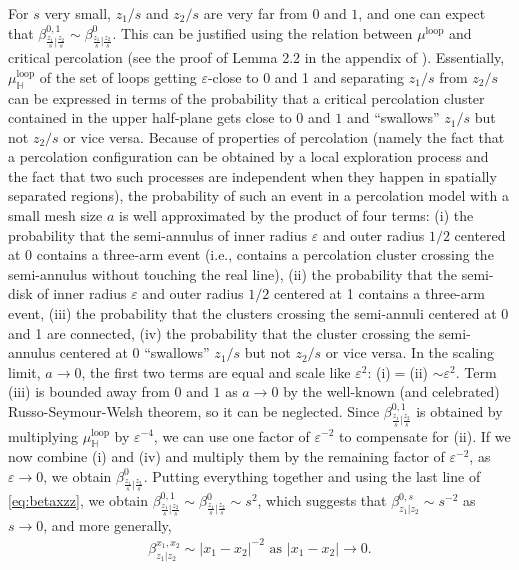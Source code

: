 \documentclass[a4paper,11pt]{article}
\begin{document}
For $s$ very small, $z_1/s$ and $z_2/s$ are very far from $0$ and $1$, and one can expect that
$\beta^{0,1}_{\frac{z_1}{s}|\frac{z_2}{s}} \sim \beta^0_{\frac{z_1}{s}|\frac{z_2}{s}}$. This can be justified using the relation between $\mu^{\text{loop}}$ and critical percolation (see the proof of Lemma 2.2 in the appendix of \cite{camia2021scalar}). Essentially, $\mu_{\mathbb{H}}^{\text{loop}}$ of the set of loops getting $\varepsilon$-close to 0 and 1 and separating $z_1/s$ from $z_2/s$ can be expressed in terms of the probability that a critical percolation cluster contained in the upper half-plane gets close to $0$ and $1$ and ``swallows'' $z_1/s$ but not $z_2/s$ or vice versa. Because of properties of percolation (namely the fact that a percolation configuration can be obtained by a local exploration process and the fact that two such processes are independent when they happen in spatially separated regions), the probability of such an event in a percolation model with a small mesh size $a$ is well approximated by the product of four terms: (i) the probability that the semi-annulus of inner radius $\varepsilon$ and outer radius $1/2$ centered at 0 contains a three-arm event (i.e., contains a percolation cluster crossing the semi-annulus without touching the real line), (ii) the probability that the semi-disk of inner radius $\varepsilon$ and outer radius $1/2$ centered at 1 contains a three-arm event, (iii) the probability that the clusters crossing the semi-annuli centered at 0 and 1 are connected, (iv) the probability that the cluster crossing the semi-annulus centered at $0$ ``swallows'' $z_1/s$ but not $z_2/s$ or vice versa.
In the scaling limit, $a \to 0$, the first two terms are equal and scale like $\varepsilon^2$: (i)$=$(ii) $\sim \varepsilon^2$. Term (iii) is bounded away from $0$ and $1$ as $a \to 0$ by the well-known (and celebrated) Russo-Seymour-Welsh theorem, so it can be neglected. Since $\beta^{0,1}_{\frac{z_1}{s}|\frac{z_2}{s}}$ is obtained by multiplying $\mu^{\text{loop}}_{\mathbb{H}}$ by $\varepsilon^{-4}$, we can use one factor of $\varepsilon^{-2}$ to compensate for (ii). If we now combine (i) and (iv) and multiply them by the remaining factor of $\varepsilon^{-2}$, as $\varepsilon \to 0$, we obtain $\beta^0_{\frac{z_1}{s}|\frac{z_2}{s}}$. Putting everything together and using the last line of \eqref{eq:betaxzz}, we obtain
$\beta^{0,1}_{\frac{z_1}{s}|\frac{z_2}{s}} \sim \beta^0_{\frac{z_1}{s}|\frac{z_2}{s}} \sim s^2$, which suggests that $\beta^{0,s}_{z_1|z_2} \sim s^{-2}$ as $s \to 0$, and more generally, 
\begin{align} \label{eq:asymptotic-behavior}
    \beta^{x_1,x_2}_{z_1|z_2} \sim |x_1-x_2|^{-2} \text{ as } |x_1-x_2| \to 0.
\end{align}
\end{document}
